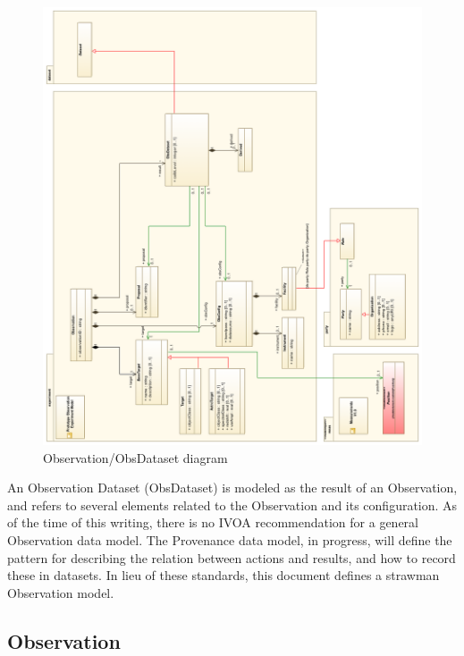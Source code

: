 \begin{figure}[h]
\begin{center}
  \includegraphics[width=5.5in]{diagrams/Observation_overview.png}
  \caption{Observation/ObsDataset diagram}\label{fig:obs_overview}
\end{center}
\end{figure}

An Observation Dataset (ObsDataset) is modeled as the result of an Observation,
and refers to several elements related to the Observation and its configuration.
As of the time of this writing, there is no IVOA recommendation for a general
Observation data model. The Provenance data model, in progress, will define
the pattern for describing the relation between actions and results, and how
to record these in datasets. In lieu of these standards, this document defines
a strawman Observation model.

\pagebreak
\subsection{Observation}
\label{sect:observation}

